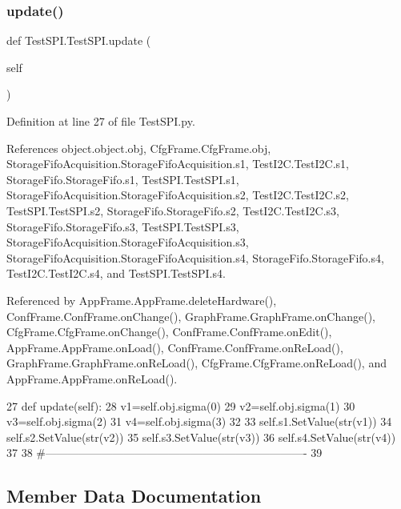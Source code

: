 \subsubsection{\texorpdfstring{update()}{update()}}
{\footnotesize\ttfamily def Test\+S\+P\+I.\+Test\+S\+P\+I.\+update (\begin{DoxyParamCaption}\item[{}]{self }\end{DoxyParamCaption})}



Definition at line 27 of file Test\+S\+P\+I.\+py.



References object.\+object.\+obj, Cfg\+Frame.\+Cfg\+Frame.\+obj, Storage\+Fifo\+Acquisition.\+Storage\+Fifo\+Acquisition.\+s1, Test\+I2\+C.\+Test\+I2\+C.\+s1, Storage\+Fifo.\+Storage\+Fifo.\+s1, Test\+S\+P\+I.\+Test\+S\+P\+I.\+s1, Storage\+Fifo\+Acquisition.\+Storage\+Fifo\+Acquisition.\+s2, Test\+I2\+C.\+Test\+I2\+C.\+s2, Test\+S\+P\+I.\+Test\+S\+P\+I.\+s2, Storage\+Fifo.\+Storage\+Fifo.\+s2, Test\+I2\+C.\+Test\+I2\+C.\+s3, Storage\+Fifo.\+Storage\+Fifo.\+s3, Test\+S\+P\+I.\+Test\+S\+P\+I.\+s3, Storage\+Fifo\+Acquisition.\+Storage\+Fifo\+Acquisition.\+s3, Storage\+Fifo\+Acquisition.\+Storage\+Fifo\+Acquisition.\+s4, Storage\+Fifo.\+Storage\+Fifo.\+s4, Test\+I2\+C.\+Test\+I2\+C.\+s4, and Test\+S\+P\+I.\+Test\+S\+P\+I.\+s4.



Referenced by App\+Frame.\+App\+Frame.\+delete\+Hardware(), Conf\+Frame.\+Conf\+Frame.\+on\+Change(), Graph\+Frame.\+Graph\+Frame.\+on\+Change(), Cfg\+Frame.\+Cfg\+Frame.\+on\+Change(), Conf\+Frame.\+Conf\+Frame.\+on\+Edit(), App\+Frame.\+App\+Frame.\+on\+Load(), Conf\+Frame.\+Conf\+Frame.\+on\+Re\+Load(), Graph\+Frame.\+Graph\+Frame.\+on\+Re\+Load(), Cfg\+Frame.\+Cfg\+Frame.\+on\+Re\+Load(), and App\+Frame.\+App\+Frame.\+on\+Re\+Load().


\begin{DoxyCode}
27     \textcolor{keyword}{def }update(self):
28         v1=self.obj.sigma(0)
29         v2=self.obj.sigma(1)
30         v3=self.obj.sigma(2)
31         v4=self.obj.sigma(3)
32 
33         self.s1.SetValue(str(v1))
34         self.s2.SetValue(str(v2))
35         self.s3.SetValue(str(v3))
36         self.s4.SetValue(str(v4))        
37 
38 \textcolor{comment}{#----------------------------------------------------------------------}
39 
\end{DoxyCode}


\subsection{Member Data Documentation}
\mbox{\label{classTestSPI_1_1TestSPI_a914dccdc9e80b9440a840e19317d41e2}} 
